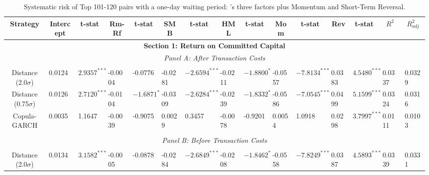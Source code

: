 \documentclass[a4paper]{article}
\begin{document}
\begin{sidewaystable}
	\caption{Systematic risk of Top 101-120 pairs with a one-day waiting period: \citet*{ff93}'s three factors plus Momentum and Short-Term Reversal.}
	\begin{threeparttable}[H]
		\centering \scriptsize
		\begin{tabularx}{\textwidth}{@{\extracolsep{\fill}}lllllllllllllll@{}}
			\toprule
			\multicolumn{1}{c}{Strategy} & \multicolumn{1}{c}{Intercept} & \multicolumn{1}{c}{t-stat} & \multicolumn{1}{c}{Rm-Rf} & \multicolumn{1}{c}{t-stat} & \multicolumn{1}{c}{SMB} & \multicolumn{1}{c}{t-stat} & \multicolumn{1}{c}{HML} & \multicolumn{1}{c}{t-stat} & \multicolumn{1}{c}{Mom} & \multicolumn{1}{c}{t-stat} & \multicolumn{1}{c}{Rev} & \multicolumn{1}{c}{t-stat} & \multicolumn{1}{c}{$R^{2}$} & \multicolumn{1}{c}{$R^{2}_{adj}$} \\
			\midrule
			\multicolumn{15}{c}{\textbf{Section 1: Return on Committed Capital}} \\
			\multicolumn{15}{c}{\textit{Panel A: After Transaction Costs}} \\
			\multicolumn{1}{c}{} & \multicolumn{1}{c}{} & \multicolumn{1}{c}{} & \multicolumn{1}{c}{} & \multicolumn{1}{c}{} & \multicolumn{1}{c}{} & \multicolumn{1}{c}{} & \multicolumn{1}{c}{} &       &       &       &       &       &       &  \\
			\multicolumn{1}{c}{Distance (2.0$\sigma$)} & 0.0124 & $2.9357^{***}$ & -0.0004 & -0.0776 & -0.0281 & $-2.6594^{***}$ & -0.0211 & $-1.8800^{*}$ & -0.0557 & $-7.8134^{***}$ & 0.0383 & $4.5480^{***}$ & 0.0337 & 0.0329 \\
			\multicolumn{1}{c}{Distance (0.75$\sigma$)} & 0.0126 & $2.7120^{***}$ & -0.0104 & $-1.6871^{*}$ & -0.0309 & $-2.6284^{***}$ & -0.0239 & $-1.8332^{*}$ & -0.0586 & $-7.0545^{***}$ & 0.0499 & $5.1599^{***}$ & 0.0324 & 0.0316 \\
			\multicolumn{1}{c}{Copula-GARCH} & 0.0035 & 1.1647 & -0.0039 & -0.9075 & 0.0029 & 0.3457 & -0.0078 & -0.9201 & 0.0054 & 1.0918 & 0.0298 & $3.7997^{***}$ & 0.0111 & 0.0103 \\
			&       &       &       &       &       &       &       &       &       &       &       &       &       &  \\
			\multicolumn{15}{c}{\textit{Panel B: Before Transaction Costs}} \\
			&       &       &       &       &       &       &       &       &       &       &       &       &       &  \\
			\multicolumn{1}{c}{Distance (2.0$\sigma$)} & 0.0134 & $3.1582^{***}$ & -0.0005 & -0.0878 & -0.0284 & $-2.6849^{***}$ & -0.0208 & $-1.8462^{*}$ & -0.0558 & $-7.8249^{***}$ & 0.0387 & $4.5893^{***}$ & 0.0339 & 0.0331 \\

\end{tabularx}
\end{threeparttable}
\end{sidewaystable}
\end{document}
